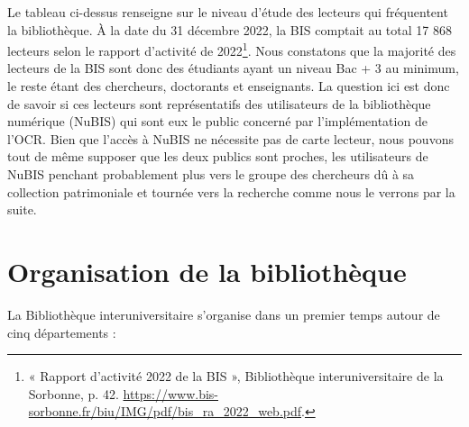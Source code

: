 \documentclass[a4paper,12pt,twoside]{book}
\begin{document}
Le tableau ci-dessus renseigne sur le niveau d'étude des lecteurs qui fréquentent la bibliothèque. À la date du 31 décembre 2022, la BIS comptait au total 17 868 lecteurs selon le rapport d'activité de 2022\footnote{« Rapport d’activité 2022 de la BIS », Bibliothèque interuniversitaire de la Sorbonne, p. 42. \url{https://www.bis-sorbonne.fr/biu/IMG/pdf/bis_ra_2022_web.pdf}.}. Nous constatons que la majorité des lecteurs de la BIS sont donc des étudiants ayant un niveau Bac + 3 au minimum, le reste étant des chercheurs, doctorants et enseignants. La question ici est donc de savoir si ces lecteurs sont représentatifs des utilisateurs de la bibliothèque numérique (NuBIS) qui sont eux le public concerné par l'implémentation de l'OCR. Bien que l'accès à NuBIS ne nécessite pas de carte lecteur, nous pouvons tout de même supposer que les deux publics sont proches, les utilisateurs de NuBIS penchant probablement plus vers le groupe des chercheurs dû à sa collection patrimoniale et tournée vers la recherche comme nous le verrons par la suite.

\section{Organisation de la bibliothèque}

La Bibliothèque interuniversitaire s'organise dans un premier temps autour de cinq départements : \\
\end{document}
